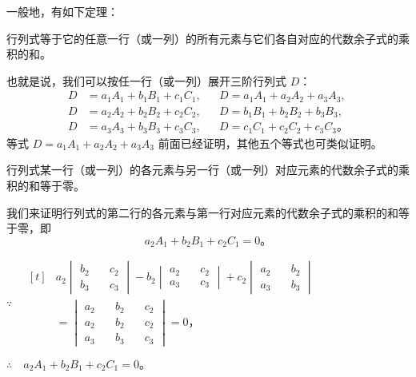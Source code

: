 一般地，有如下定理：

\begin{theorem}\label{theorem:sjhlszk-1}
    行列式等于它的任意一行（或一列）的所有元素与它们各自对应的代数余子式的乘积的和。
\end{theorem}

也就是说，我们可以按任一行（或一列）展开三阶行列式 $D$：
\begin{align*}
    D &= a_1A_1 + b_1B_1 + c_1C_1, && D = a_1A_1 + a_2A_2 + a_3A_3, \\
    D &= a_2A_2 + b_2B_2 + c_2C_2, && D = b_1B_1 + b_2B_2 + b_3B_3, \\
    D &= a_3A_3 + b_3B_3 + c_3C_3, && D = c_1C_1 + c_2C_2 + c_3C_3 \text{。}
\end{align*}
等式 $D = a_1A_1 + a_2A_2 + a_3A_3$ 前面已经证明，其他五个等式也可类似证明。


\begin{theorem}\label{theorem:sjhlszk-2}
    行列式某一行（或一列）的各元素与另一行（或一列）对应元素的代数余子式的乘积的和等于零。
\end{theorem}

\zhengming 我们来证明行列式的第二行的各元素与第一行对应元素的代数余子式的乘积的和等于零，即
$$ a_2A_1 + b_2B_1 + c_2C_1 = 0 \text{。} $$

$\because \quad
\begin{aligned}[t]
  & a_2 \begin{vmatrix}
            b_2 \quad & c_2 \\
            b_3 \quad & c_3
        \end{vmatrix}
    - b_2 \begin{vmatrix}
            a_2 \quad & c_2 \\
            a_3 \quad & c_3
        \end{vmatrix}
    + c_2 \begin{vmatrix}
            a_2 \quad & b_2 \\
            a_3 \quad & b_3
        \end{vmatrix} \\
 &= \begin{vmatrix*}
        a_2 \quad & b_2 \quad & c_2 \\
        a_2 \quad & b_2 \quad & c_2 \\
        a_3 \quad & b_3 \quad & c_3
    \end{vmatrix*}
    = 0 \text{，}
\end{aligned}$

$\therefore \quad a_2A_1 + b_2B_1 + c_2C_1 = 0 \text{。}$

